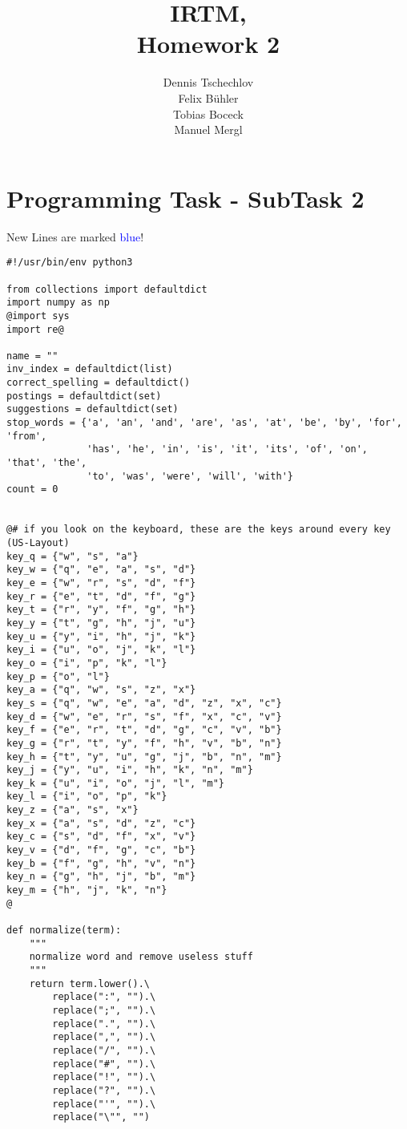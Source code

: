 \documentclass[12pt,pdftex,a4paper]{article}
\begin{document}
\title{ IRTM,\\ Homework 2}
\author{Dennis Tschechlov\\
		Felix Bühler\\
		Tobias Boceck\\
		Manuel Mergl}
\maketitle
\section*{Programming Task - SubTask 2}


New Lines are marked \textcolor{blue}{blue}!

\begin{lstlisting}[style=base]
#!/usr/bin/env python3

from collections import defaultdict
import numpy as np
@import sys
import re@

name = ""
inv_index = defaultdict(list)
correct_spelling = defaultdict()
postings = defaultdict(set)
suggestions = defaultdict(set)
stop_words = {'a', 'an', 'and', 'are', 'as', 'at', 'be', 'by', 'for', 'from',
              'has', 'he', 'in', 'is', 'it', 'its', 'of', 'on', 'that', 'the',
              'to', 'was', 'were', 'will', 'with'}
count = 0


@# if you look on the keyboard, these are the keys around every key (US-Layout)
key_q = {"w", "s", "a"}
key_w = {"q", "e", "a", "s", "d"}
key_e = {"w", "r", "s", "d", "f"}
key_r = {"e", "t", "d", "f", "g"}
key_t = {"r", "y", "f", "g", "h"}
key_y = {"t", "g", "h", "j", "u"}
key_u = {"y", "i", "h", "j", "k"}
key_i = {"u", "o", "j", "k", "l"}
key_o = {"i", "p", "k", "l"}
key_p = {"o", "l"}
key_a = {"q", "w", "s", "z", "x"}
key_s = {"q", "w", "e", "a", "d", "z", "x", "c"}
key_d = {"w", "e", "r", "s", "f", "x", "c", "v"}
key_f = {"e", "r", "t", "d", "g", "c", "v", "b"}
key_g = {"r", "t", "y", "f", "h", "v", "b", "n"}
key_h = {"t", "y", "u", "g", "j", "b", "n", "m"}
key_j = {"y", "u", "i", "h", "k", "n", "m"}
key_k = {"u", "i", "o", "j", "l", "m"}
key_l = {"i", "o", "p", "k"}
key_z = {"a", "s", "x"}
key_x = {"a", "s", "d", "z", "c"}
key_c = {"s", "d", "f", "x", "v"}
key_v = {"d", "f", "g", "c", "b"}
key_b = {"f", "g", "h", "v", "n"}
key_n = {"g", "h", "j", "b", "m"}
key_m = {"h", "j", "k", "n"}
@

def normalize(term):
    """
    normalize word and remove useless stuff
    """
    return term.lower().\
        replace(":", "").\
        replace(";", "").\
        replace(".", "").\
        replace(",", "").\
        replace("/", "").\
        replace("#", "").\
        replace("!", "").\
        replace("?", "").\
        replace("'", "").\
        replace("\"", "")



\end{lstlisting}
\end{document}
